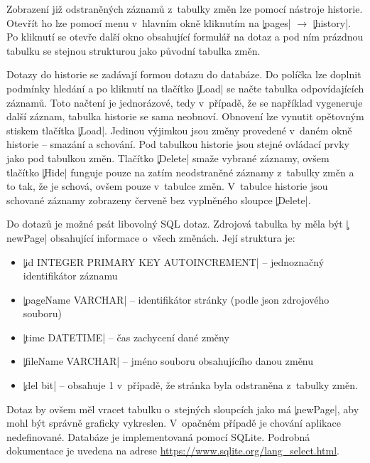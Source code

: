 Zobrazení již odstraněných záznamů z~tabulky změn lze pomocí nástroje historie.
Otevřít ho lze pomocí menu v~hlavním okně kliknutím na \c|pages| $\rightarrow$ \c|history|.
Po kliknutí se otevře další okno obsahující formulář na dotaz a pod ním prázdnou tabulku se stejnou strukturou jako původní tabulka změn.

Dotazy do historie se zadávají formou dotazu do databáze. 
Do políčka lze doplnit podmínky hledání a po kliknutí na tlačítko \c|Load| se načte tabulka odpovídajících záznamů. 
Toto načtení je jednorázové, tedy v~případě, že se například vygeneruje další záznam, tabulka historie se sama neobnoví.
Obnovení lze vynutit opětovným stiskem tlačítka \c|Load|.
Jedinou výjimkou jsou změny provedené v~daném okně historie -- smazání a schování.
Pod tabulkou historie jsou stejné ovládací prvky jako pod tabulkou změn.
Tlačítko \c|Delete| smaže vybrané záznamy, ovšem tlačítko \c|Hide| funguje pouze na zatím neodstraněné záznamy z~tabulky změn a to tak, že je schová, ovšem pouze v~tabulce změn.
V~tabulce historie jsou schované záznamy zobrazeny červeně bez vyplněného sloupce \c|Delete|.

Do dotazů je možné psát libovolný SQL dotaz.
Zdrojová tabulka by měla být \c|newPage| obsahující informace o~všech změnách. Její struktura je:
\begin{itemize}
	\item \c|id INTEGER PRIMARY KEY AUTOINCREMENT| -- jednoznačný identifikátor záznamu
	\item \c|pageName VARCHAR| -- identifikátor stránky (podle json zdrojového souboru)
	\item \c|time DATETIME| -- čas zachycení dané změny
	\item \c|fileName VARCHAR| -- jméno souboru obsahujícího danou změnu
	\item \c|del bit| -- obsahuje 1 v~případě, že stránka byla odstraněna z~tabulky změn.
\end{itemize}
Dotaz by ovšem měl vracet tabulku o~stejných sloupcích jako má \c|newPage|, aby mohl být správně graficky vykreslen.
V~opačném případě je chování aplikace nedefinované.
Databáze je implementovaná pomocí SQLite.
Podrobná dokumentace je uvedena na adrese \url{https://www.sqlite.org/lang_select.html}.

